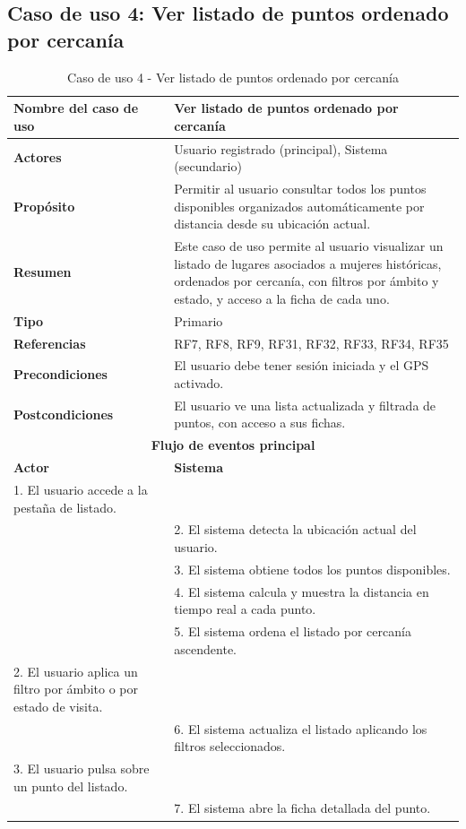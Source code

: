 \subsection{Caso de uso 4: Ver listado de puntos ordenado por cercanía}

\begin{table}[H]
\centering
\caption{Caso de uso 4 - Ver listado de puntos ordenado por cercanía}
\begin{tabular}{|p{4.5cm}|p{10.5cm}|}
\hline
\textbf{Nombre del caso de uso} & Ver listado de puntos ordenado por cercanía \\
\hline
\textbf{Actores} & Usuario registrado (principal), Sistema (secundario) \\
\hline
\textbf{Propósito} & Permitir al usuario consultar todos los puntos disponibles organizados automáticamente por distancia desde su ubicación actual. \\
\hline
\textbf{Resumen} & Este caso de uso permite al usuario visualizar un listado de lugares asociados a mujeres históricas, ordenados por cercanía, con filtros por ámbito y estado, y acceso a la ficha de cada uno. \\
\hline
\textbf{Tipo} & Primario \\
\hline
\textbf{Referencias} & RF7, RF8, RF9, RF31, RF32, RF33, RF34, RF35 \\
\hline
\textbf{Precondiciones} & El usuario debe tener sesión iniciada y el GPS activado. \\
\hline
\textbf{Postcondiciones} & El usuario ve una lista actualizada y filtrada de puntos, con acceso a sus fichas. \\
\hline
\multicolumn{2}{|c|}{\textbf{Flujo de eventos principal}} \\
\hline
\textbf{Actor} & \textbf{Sistema} \\
\hline
1. El usuario accede a la pestaña de listado. & \\
\hline
& 2. El sistema detecta la ubicación actual del usuario. \\
\hline
& 3. El sistema obtiene todos los puntos disponibles. \\
\hline
& 4. El sistema calcula y muestra la distancia en tiempo real a cada punto. \\
\hline
& 5. El sistema ordena el listado por cercanía ascendente. \\
\hline
2. El usuario aplica un filtro por ámbito o por estado de visita. & \\
\hline
& 6. El sistema actualiza el listado aplicando los filtros seleccionados. \\
\hline
3. El usuario pulsa sobre un punto del listado. & \\
\hline
& 7. El sistema abre la ficha detallada del punto. \\
\hline
\end{tabular}
\end{table}

